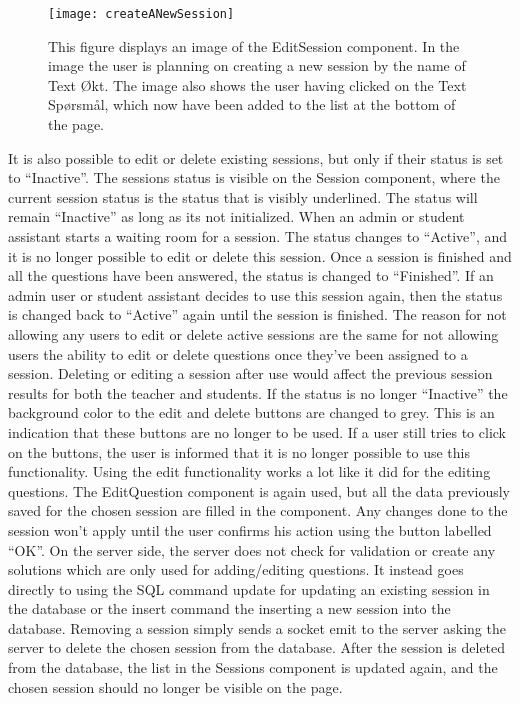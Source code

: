 \begin{figure}[H]
	\texttt{[image: createANewSession]}
	\caption{This figure displays an image of the EditSession component. In the image the user is planning on creating a new session by the name of Text Økt. The image also shows the user having clicked on the Text Spørsmål, which now have been added to the list at the bottom of the page.}
	\label{fig:editSessionComponent}
\end{figure}
\noindent
It is also possible to edit or delete existing sessions, but only if their status is set to “Inactive”. The sessions status is visible on the Session component, where the current session status is the status that is visibly underlined. The status will remain “Inactive” as long as its not initialized. When an admin or student assistant starts a waiting room for a session. The status changes to “Active”, and it is no longer possible to edit or delete this session. Once a session is finished and all the questions have been answered, the status is changed to “Finished”. If an admin user or student assistant decides to use this session again, then the status is changed back to “Active” again until the session is finished. The reason for not allowing any users to edit or delete active sessions are the same for not allowing users the ability to edit or delete questions once they’ve been assigned to a session. Deleting or editing a session after use would affect the previous session results for both the teacher and students. If the status is no longer “Inactive” the background color to the edit and delete buttons are changed to grey. This is an indication that these buttons are no longer to be used. If a user still tries to click on the buttons, the user is informed that it is no longer possible to use this functionality. Using the edit functionality works a lot like it did for the editing questions. The EditQuestion component is again used, but all the data previously saved for the chosen session are filled in the component. Any changes done to the session won’t apply until the user confirms his action using the button labelled “OK”. On the server side, the server does not check for validation or create any solutions which are only used for adding/editing questions. It instead goes directly to using the SQL command update for updating an existing session in the database or the insert command the inserting a new session into the database. Removing a session simply sends a socket emit to the server asking the server to delete the chosen session from the database. After the session is deleted from the database, the list in the Sessions component is updated again, and the chosen session should no longer be visible on the page.

